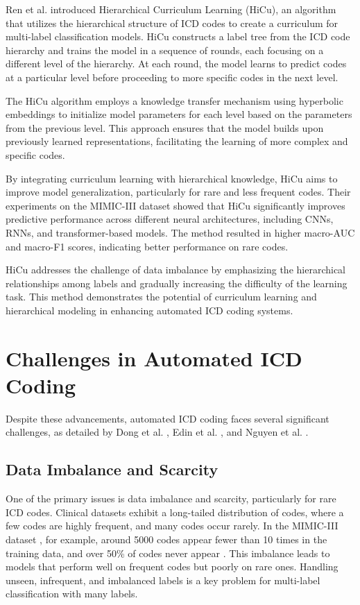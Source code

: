\documentclass[12pt,a4paper]{report}
\begin{document}
Ren et al. \cite{ren2022hicu} introduced Hierarchical Curriculum Learning (HiCu), an algorithm that utilizes the hierarchical structure of ICD codes to create a curriculum for multi-label classification models. HiCu constructs a label tree from the ICD code hierarchy and trains the model in a sequence of rounds, each focusing on a different level of the hierarchy. At each round, the model learns to predict codes at a particular level before proceeding to more specific codes in the next level.

The HiCu algorithm employs a knowledge transfer mechanism using hyperbolic embeddings to initialize model parameters for each level based on the parameters from the previous level. This approach ensures that the model builds upon previously learned representations, facilitating the learning of more complex and specific codes.

By integrating curriculum learning with hierarchical knowledge, HiCu aims to improve model generalization, particularly for rare and less frequent codes. Their experiments on the MIMIC-III dataset showed that HiCu significantly improves predictive performance across different neural architectures, including CNNs, RNNs, and transformer-based models. The method resulted in higher macro-AUC and macro-F1 scores, indicating better performance on rare codes.

HiCu addresses the challenge of data imbalance by emphasizing the hierarchical relationships among labels and gradually increasing the difficulty of the learning task. This method demonstrates the potential of curriculum learning and hierarchical modeling in enhancing automated ICD coding systems.

\section{Challenges in Automated ICD Coding}

Despite these advancements, automated ICD coding faces several significant challenges, as detailed by Dong et al. \cite{dong2022automated}, Edin et al. \cite{edin2023automated}, and Nguyen et al. \cite{nguyen2023mimic}.

\subsection{Data Imbalance and Scarcity}

One of the primary issues is data imbalance and scarcity, particularly for rare ICD codes. Clinical datasets exhibit a long-tailed distribution of codes, where a few codes are highly frequent, and many codes occur rarely. In the MIMIC-III dataset \cite{johnson2016mimic}, for example, around 5000 codes appear fewer than 10 times in the training data, and over 50\% of codes never appear \cite{rios2018few}. This imbalance leads to models that perform well on frequent codes but poorly on rare ones. Handling unseen, infrequent, and imbalanced labels is a key problem for multi-label classification with many labels.
\end{document}
